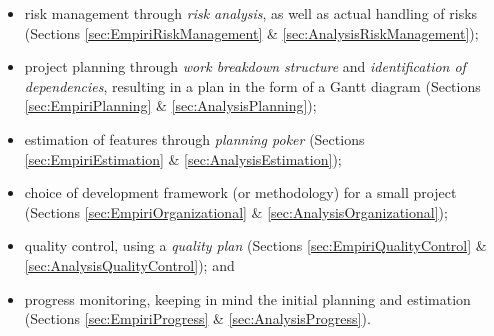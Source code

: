 \begin{itemize}
    \item risk management through \emph{risk analysis}, as well as actual handling of risks
        (Sections \ref{sec:EmpiriRiskManagement} \& \ref{sec:AnalysisRiskManagement});
    \item project planning through \emph{work breakdown structure} and \emph{identification of
        dependencies}, resulting in a plan in the form of a Gantt diagram (Sections
        \ref{sec:EmpiriPlanning} \& \ref{sec:AnalysisPlanning});
    \item estimation of features through \emph{planning poker} (Sections
        \ref{sec:EmpiriEstimation} \& \ref{sec:AnalysisEstimation});
    \item choice of development framework (or methodology) for a small project (Sections
        \ref{sec:EmpiriOrganizational} \& \ref{sec:AnalysisOrganizational});
    \item quality control, using a \emph{quality plan} (Sections \ref{sec:EmpiriQualityControl}
        \& \ref{sec:AnalysisQualityControl}); and
    \item progress monitoring, keeping in mind the initial planning and estimation (Sections
        \ref{sec:EmpiriProgress} \& \ref{sec:AnalysisProgress}).
\end{itemize}